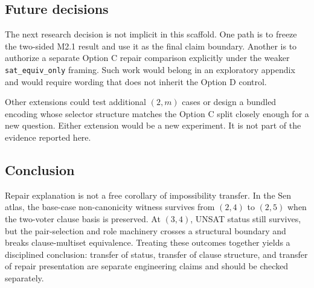 \subsection{Future decisions}

The next research decision is not implicit in this scaffold.  One path is to
freeze the two-sided M2.1 result and use it as the final claim boundary.
Another is to authorize a separate Option C repair comparison explicitly under
the weaker \texttt{sat\_equiv\_only} framing.  Such work would belong in an
exploratory appendix and would require wording that does not inherit the
Option D control.

Other extensions could test additional $(2,m)$ cases or design a bundled
encoding whose selector structure matches the Option C split closely enough
for a new \CM{} question.  Either extension would be a new experiment.  It is
not part of the evidence reported here.

\subsection{Conclusion}

Repair explanation is not a free corollary of impossibility transfer.  In the
Sen atlas, the base-case non-canonicity witness survives from $(2,4)$ to $(2,5)$
when the two-voter clause basis is preserved.  At $(3,4)$, UNSAT status still
survives, but the pair-selection and role machinery crosses a structural
boundary and breaks clause-multiset equivalence.  Treating these outcomes
together yields a disciplined conclusion: transfer of status, transfer of
clause structure, and transfer of repair presentation are separate engineering
claims and should be checked separately.
